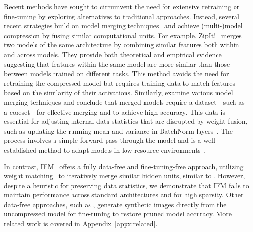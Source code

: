 \documentclass{article}
\begin{document}
Recent methods have sought to circumvent the need for extensive retraining or fine-tuning by exploring alternatives to traditional approaches. Instead, several recent strategies build on model merging techniques~\citep{entezari2022role,ainsworth2023git,jordan2022repair} and achieve (multi-)model compression by fusing similar computational units. For example, ZipIt!~\citep{stoica2024zipitmergingmodelsdifferent} merges two models of the same architecture by combining similar features both within and across models. They provide both theoretical and empirical evidence suggesting that features within the same model are more similar than those between models trained on different tasks. This method avoids the need for retraining the compressed model but requires training data to match features based on the similarity of their activations. Similarly, \citet{yamada2023revisitingpermutationsymmetrymerging} examine various model merging techniques and conclude that merged models require a dataset—such as a coreset—for effective merging and to achieve high accuracy. This data is essential for adjusting internal data statistics that are disrupted by weight fusion, such as updating the running mean and variance in BatchNorm layers~\citep{ioffe2015BatchNormalizationacceleratingdeep}. The process involves a simple forward pass through the model and is a well-established method to adapt models in low-resource environments~\citep{leitner2023sitrelaxlearningdrive}. 

In contrast, IFM~\citep{chen2023going} offers a fully data-free and fine-tuning-free approach, utilizing weight matching~\citep{ainsworth2023git} to iteratively merge similar hidden units, similar to \citet{stoica2024zipitmergingmodelsdifferent}. However, despite a heuristic for preserving data statistics, we demonstrate that IFM fails to maintain performance across standard architectures and for high sparsity. Other data-free approaches, such as \citep{yin2020dreamingdistilldatafreeknowledge}, generate synthetic images directly from the uncompressed model for fine-tuning to restore pruned model accuracy. More related work is covered in Appendix~\ref{appx:related}.
\end{document}

